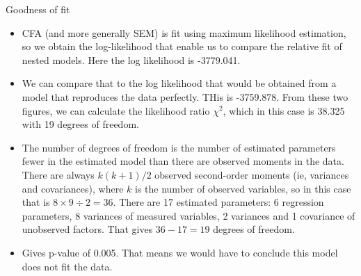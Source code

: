 \documentclass[10pt,ignorenonframetext,]{beamer}
\providecommand{\tightlist}{%
\setlength{\itemsep}{0pt}\setlength{\parskip}{0pt}}
\begin{document}
\begin{frame}{Goodness of fit}

\small

\begin{itemize}
\tightlist
\item
  CFA (and more generally SEM) is fit using maximum likelihood
  estimation, so we obtain the log-likelihood that enable us to compare
  the relative fit of nested models. Here the log likelihood is
  -3779.041.
\item
  We can compare that to the log likelihood that would be obtained from
  a model that reproduces the data perfectly. THis is -3759.878. From
  these two figures, we can calculate the likelihood ratio \(\chi^2\),
  which in this case is 38.325 with 19 degrees of freedom.
\item
  The number of degrees of freedom is the number of estimated parameters
  fewer in the estimated model than there are observed moments in the
  data. There are always \(k(k+1)/2\) observed second-order moments (ie,
  variances and covariances), where \(k\) is the number of observed
  variables, so in this case that is \(8 \times 9 \div 2 = 36.\) There
  are 17 estimated parameters: 6 regression parameters, 8 variances of
  measured variables, 2 variances and 1 covariance of unobserved
  factors. That gives \(36 - 17 = 19\) degrees of freedom.
\item
  Gives p-value of 0.005. That means we would have to conclude this
  model does not fit the data.
\end{itemize}

\end{frame}
\end{document}
